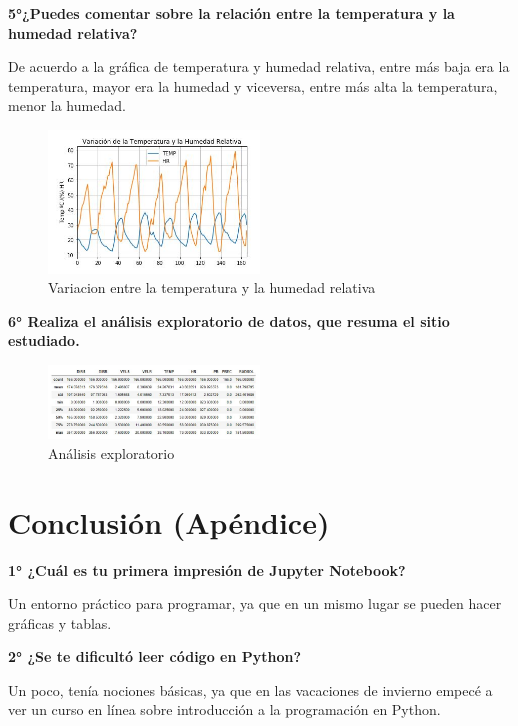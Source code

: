 \documentclass[a4paper]{article}
\begin{document}
\textbf{5°¿Puedes comentar sobre la relación entre la temperatura y la humedad relativa?}

De acuerdo a la gráfica de temperatura y humedad relativa, entre más baja era la temperatura, mayor era la humedad y viceversa, entre más alta la temperatura, menor la humedad.

\begin{figure}[ht!]
\centering
\includegraphics[width=0.5\textwidth]{Variacion_Temp_y_Humedad_Relativa.JPG}
\caption{\label{fig:Diferencias de los máximos y mínimos de cada magntiud medida }Variacion entre la temperatura y la humedad relativa}
\end{figure} 

\textbf{6° Realiza el análisis exploratorio de datos, que resuma el sitio estudiado.}

\begin{figure}[ht!]
\centering
\includegraphics[width=0.5\textwidth]{An_lisis_Exploratorio.JPG}
\caption{\label{fig:Análisis exploratorio de datos }Análisis exploratorio}
\end{figure} 

\section{Conclusión (Apéndice)}
\textbf{1° ¿Cuál es tu primera impresión de Jupyter Notebook?}

Un entorno práctico para programar, ya que en un mismo lugar se pueden hacer gráficas y tablas. 

\textbf{2° ¿Se te dificultó leer código en Python?}

Un poco, tenía nociones básicas, ya que en las vacaciones de invierno empecé a ver un curso en línea sobre introducción a la programación en Python.
\end{document}
